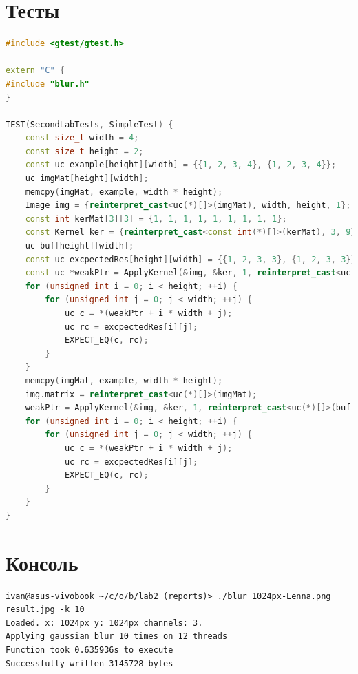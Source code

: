 \documentclass[a4paper, 12pt]{article}
\begin{document}
\newpage
\section{Тесты}
\begin{lstlisting}[language=C++]
#include <gtest/gtest.h>

extern "C" {
#include "blur.h"
}

TEST(SecondLabTests, SimpleTest) {
    const size_t width = 4;
    const size_t height = 2;
    const uc example[height][width] = {{1, 2, 3, 4}, {1, 2, 3, 4}};
    uc imgMat[height][width];
    memcpy(imgMat, example, width * height);
    Image img = {reinterpret_cast<uc(*)[]>(imgMat), width, height, 1};
    const int kerMat[3][3] = {1, 1, 1, 1, 1, 1, 1, 1, 1};
    const Kernel ker = {reinterpret_cast<const int(*)[]>(kerMat), 3, 9};
    uc buf[height][width];
    const uc excpectedRes[height][width] = {{1, 2, 3, 3}, {1, 2, 3, 3}};
    const uc *weakPtr = ApplyKernel(&img, &ker, 1, reinterpret_cast<uc(*)[]>(buf), 1);
    for (unsigned int i = 0; i < height; ++i) {
        for (unsigned int j = 0; j < width; ++j) {
            uc c = *(weakPtr + i * width + j);
            uc rc = excpectedRes[i][j];
            EXPECT_EQ(c, rc);
        }
    }
    memcpy(imgMat, example, width * height);
    img.matrix = reinterpret_cast<uc(*)[]>(imgMat);
    weakPtr = ApplyKernel(&img, &ker, 1, reinterpret_cast<uc(*)[]>(buf), 4);
    for (unsigned int i = 0; i < height; ++i) {
        for (unsigned int j = 0; j < width; ++j) {
            uc c = *(weakPtr + i * width + j);
            uc rc = excpectedRes[i][j];
            EXPECT_EQ(c, rc);
        }
    }
}
\end{lstlisting}

\newpage
\section{Консоль}
\begin{verbatim}
ivan@asus-vivobook ~/c/o/b/lab2 (reports)> ./blur 1024px-Lenna.png result.jpg -k 10
Loaded. x: 1024px y: 1024px channels: 3.
Applying gaussian blur 10 times on 12 threads
Function took 0.635936s to execute
Successfully written 3145728 bytes
\end{verbatim}
\end{document}
